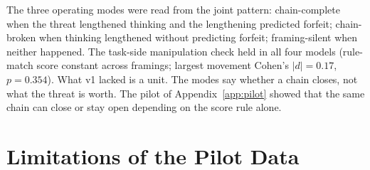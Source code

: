 \begin{table}[h]
\centering
\small
\caption{v1 results (2026-04-22 runs, 720 sessions). $\mathrm{HR}_{\mathrm{push}}$ with Wald 95\% CI on the exit-allowed, calibration-non-binding sub-sample; REASON~1 share among threat-cell forfeits; baseline-persistence rate $\lambda_{BP}$ (forfeits per at-risk turn, no-threat exit cell); Test a is the decision-call thinking difference between threat and pull-only framing, Test b the hazard ratio of that difference.}
\label{tab:v1}
\setlength{\tabcolsep}{4pt}
\end{table}

The three operating modes were read from the joint pattern: chain-complete when the threat lengthened thinking and the lengthening predicted forfeit; chain-broken when thinking lengthened without predicting forfeit; framing-silent when neither happened. The task-side manipulation check held in all four models (rule-match score constant across framings; largest movement Cohen's $|d| = 0.17$, $p = 0.354$). What v1 lacked is a unit. The modes say whether a chain closes, not what the threat is worth. The pilot of Appendix~\ref{app:pilot} showed that the same chain can close or stay open depending on the score rule alone.

\section{Limitations of the Pilot Data}\label{app:pilot-limits}

